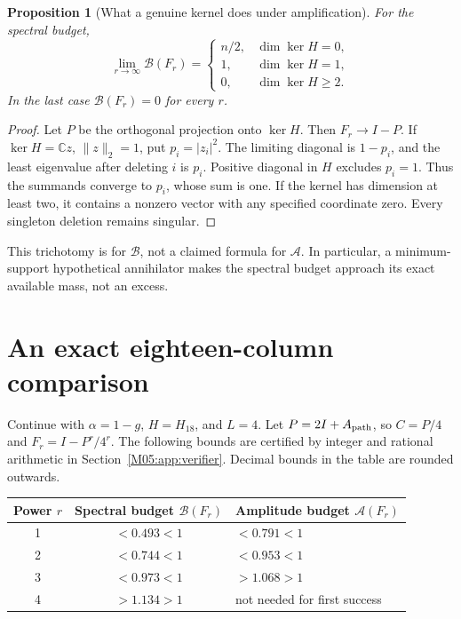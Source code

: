 \documentclass[11pt,a4paper,oneside]{report}
\newtheorem{proposition}[theorem]{Proposition}
\theoremstyle{definition}
\theoremstyle{remark}
\newcommand{\C}{\mathbb C}
\newcommand{\BB}{\mathcal B}
\newcommand{\ABudget}{\mathcal A}
\begin{document}
\begin{proposition}[What a genuine kernel does under amplification]
\label{M05:prop:endpoint}
For the spectral budget,
\[
 \lim_{r\to\infty}\BB(F_r)=
 \begin{cases}
 n/2,&\dim\ker H=0,\\
 1,&\dim\ker H=1,\\
 0,&\dim\ker H\ge2 .
 \end{cases}
\]
In the last case $\BB(F_r)=0$ for every $r$.
\end{proposition}
\begin{proof}
Let $P$ be the orthogonal projection onto $\ker H$.
Then $F_r\to I-P$. If $\ker H=\C z$, $\|z\|_2=1$, put
$p_i=|z_i|^2$. The limiting diagonal is $1-p_i$, and
the least eigenvalue after deleting $i$ is $p_i$.
Positive diagonal in $H$ excludes $p_i=1$. Thus the summands
converge to $p_i$, whose sum is one. If the kernel has dimension
at least two, it contains a nonzero vector with any specified
coordinate zero. Every singleton deletion remains singular.
\end{proof}
This trichotomy is for $\BB$, not a claimed formula for $\ABudget$.
In particular, a minimum-support hypothetical annihilator makes
the spectral budget approach its exact available mass, not an
excess.

\section{An exact eighteen-column comparison}
\label{M05:sec:eighteen}

Continue with $\alpha=1-g$, $H=H_{18}$, and $L=4$.
Let $P=2I+A_{\rm path}$, so
$C=P/4$ and $F_r=I-P^r/4^r$.
The following bounds are certified by integer and rational
arithmetic in Section~\ref{M05:app:verifier}. Decimal bounds in the
table are rounded outwards.

\begin{center}
\begin{tabular}{ccl}
\toprule
Power $r$ & Spectral budget $\BB(F_r)$ & Amplitude budget $\ABudget(F_r)$\\
\midrule
1 & $<0.493<1$ & $<0.791<1$\\
2 & $<0.744<1$ & $<0.953<1$\\
3 & $<0.973<1$ & $>1.068>1$\\
4 & $>1.134>1$ & not needed for first success\\
\bottomrule
\end{tabular}
\end{center}
\end{document}
